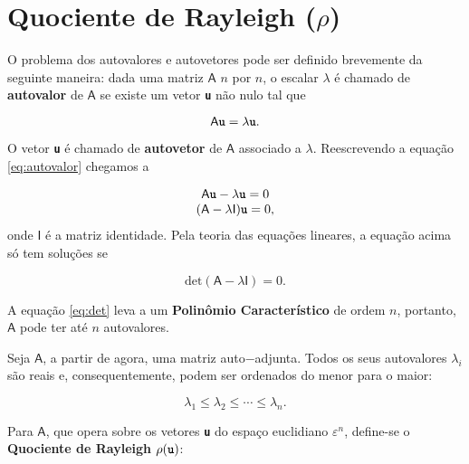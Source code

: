 \chapter{Quociente de Rayleigh ($\rho$)\label{cap:algebra}}

O problema dos autovalores e autovetores pode ser definido brevemente da seguinte maneira: dada uma matriz $\mathsf{A}$ $n$ por $n$, o escalar $\lambda$ é chamado de \textbf{autovalor} de $\mathsf{A}$ se existe um vetor \textbf{\texttt{u}} não nulo tal que

\begin{equation}\label{eq:autovalor}
	\mathsf{A} \textbf{\texttt{u}} = \lambda \textbf{\texttt{u}}.
\end{equation}

O vetor \textbf{\texttt{u}} é chamado de \textbf{autovetor} de $\mathsf{A}$ associado a $\lambda$. Reescrevendo a equação \ref{eq:autovalor} chegamos a 

\begin{equation}
		\begin{array}{c}
			\mathsf{A} \textbf{\texttt{u}} - \lambda \textbf{\texttt{u}} = 0 \\
			(\mathsf{A} - \lambda \mathsf{I})\textbf{\texttt{u}} = 0,
		\end{array}
\end{equation}
onde $\mathsf{I}$ é a matriz identidade. Pela teoria das equações lineares, a equação acima só tem soluções se

\begin{equation}\label{eq:det}
	\mbox{det}(\mathsf{A} - \lambda \mathsf{I}) = 0.
\end{equation}

A equação \ref{eq:det} leva a um \textbf{Polinômio Característico} de ordem $n$, portanto, $\mathsf{A}$ pode ter até $n$ autovalores.

Seja $\mathsf{A}$, a partir de agora, uma matriz auto$-$adjunta. Todos os seus autovalores $\lambda_i$ são reais e, consequentemente, podem ser ordenados do menor para o maior:

	\begin{equation}\label{eq:autovalores_ordenados}
		\lambda_1 \leq \lambda_2 \leq \cdots \leq \lambda_n.
	\end{equation}

Para $\mathsf{A}$, que opera sobre os vetores \textbf{\texttt{u}} do espaço euclidiano $\varepsilon^n$, define-se o \textbf{Quociente de Rayleigh} $\rho (\textbf{\texttt{u}})$:

